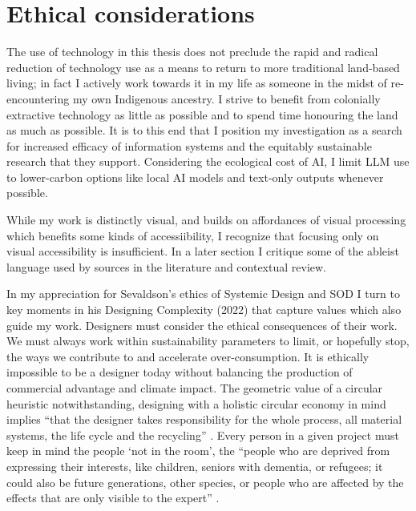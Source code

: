 \section{Ethical considerations}
The use of technology in this thesis does not preclude the rapid and radical reduction of technology use as a means to return to more traditional land-based living; in fact I actively work towards it in my life as someone in the midst of re-encountering my own Indigenous ancestry. I strive to benefit from colonially extractive technology as little as possible and to spend time honouring the land as much as possible. It is to this end that I position my investigation as a search for increased efficacy of information systems and the equitably sustainable research that they support. Considering the ecological cost of AI, I limit LLM use to lower-carbon options like local AI models and text-only outputs whenever possible. 

While my work is distinctly visual, and builds on affordances of visual processing which benefits some kinds of accessiibility, I recognize that focusing only on visual accessibility is insufficient. In a later section I critique some of the ableist language used by sources in the literature and contextual review. 

In my appreciation for Sevaldson’s ethics of Systemic Design and SOD I turn to key moments in his Designing Complexity (2022) that capture values which also guide my work. Designers must consider the ethical consequences of their work. We must always work within sustainability parameters to limit, or hopefully stop, the ways we contribute to and accelerate over-consumption. It is ethically impossible to be a designer today without balancing the production of commercial advantage and climate impact. The geometric value of a circular heuristic notwithstanding, designing with a holistic circular economy in mind implies ``that the designer takes responsibility for the whole process, all material systems, the life cycle and the recycling” \citep[p. 36]{sevaldson_designing_2022}. Every person in a given project must keep in mind the people `not in the room’, the ``people who are deprived from expressing their interests, like children, seniors with dementia, or refugees; it could also be future generations, other species, or people who are affected by the effects that are only visible to the expert” \citep[p. 97]{sevaldson_designing_2022}.

